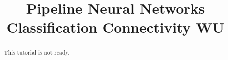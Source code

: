 \documentclass[justified]{tufte-handout}
\title{Pipeline Neural Networks Classification Connectivity WU}
\begin{document}
\maketitle

\begin{abstract}
\noindent
This tutorial is not ready.
\end{abstract}
\end{document}

